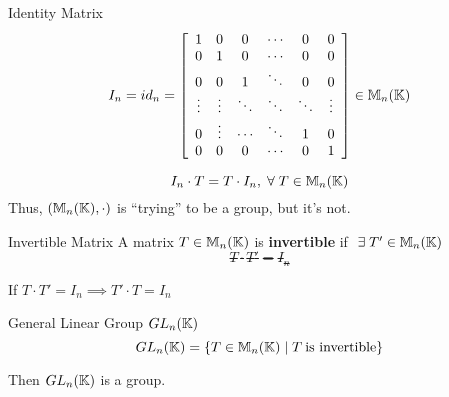\begin{definition} {Identity Matrix}
    \[
        I_n = id_n = \left[
            \begin{array}{cccccc}
                1      & 0      & 0      & \cdots & 0      & 0      \\
                0      & 1      & 0      & \cdots & 0      & 0      \\
                0      & 0      & 1      & \ddots & 0      & 0      \\
                \vdots & \vdots & \ddots & \ddots & \ddots & \vdots \\
                0      & \vdots & \cdots      & \ddots & 1      & 0      \\
                0      & 0      & 0      & \cdots & 0      & 1      \\
            \end{array}
            \right] \in \mathbb{M}_n(\mathbb{K})
    \]
\end{definition}

\begin{observe}
    \[
        I_n \cdot T = T \cdot I_n, \forall T \in \bbm_n(\bbk)
    \]
    Thus, \((\mathbb{M}_n(\mathbb{K}), \cdot)\) is ``trying'' to be a group, but it's not.
\end{observe}

\begin{definition} {Invertible Matrix}
    A matrix \(T \in \mathbb{M}_n(\mathbb{K})\) is \textbf{invertible} if \(\exists T' \in \bbm_n(\bbk)\) \st \[T \cdot T' = I_n\]
\end{definition}
\begin{exercise}
    If \(T \cdot T' = I_n \implies T' \cdot T = I_n\)
\end{exercise}

\begin{definition} {General Linear Group \(GL_n(\mathbb{K})\)}
    \[GL_n(\mathbb{K}) = \{T\in \mathbb{M}_n(\mathbb{K}) \mid T \:\text{is invertible}\}\]
\end{definition}

\begin{remark}
    Then \(GL_n(\mathbb{K})\) is a group.
\end{remark}


